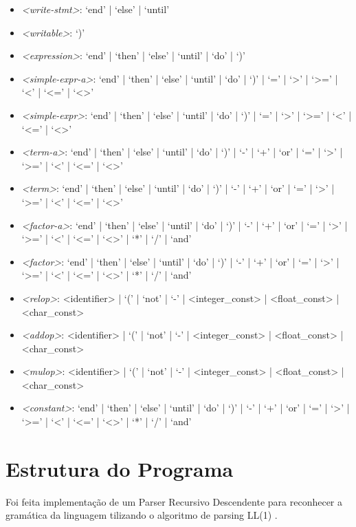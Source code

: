 \begin{itemize}
\begin{itemize}
            \item \textit{<write-stmt>}: `end' | `else' | `until' 
            \item \textit{<writable>}: `)'
            \item \textit{<expression>}: `end' | `then' | `else' | `until' | `do' | `)'
            \item \textit{<simple-expr-a>}: `end' | `then' | `else' | `until' | `do' | `)' | `=' | `>' | `>=' | `<' | `<=' | `<>'
            \item \textit{<simple-expr>}: `end' | `then' | `else' | `until' | `do' | `)' | `=' | `>' | `>=' | `<' | `<=' | `<>'
            \item \textit{<term-a>}: `end' | `then' | `else' | `until' | `do' | `)' | `-' | `+' | `or' | `=' | `>' | `>=' | `<' | `<=' | `<>'
            \item \textit{<term>}: `end' | `then' | `else' | `until' | `do' | `)' | `-' | `+' | `or' | `=' | `>' | `>=' | `<' | `<=' | `<>'
            \item \textit{<factor-a>}: `end' | `then' | `else' | `until' | `do' | `)' | `-' | `+' | `or' | `=' | `>' | `>=' | `<' | `<=' | `<>' | `*' | `/' | `and'
            \item \textit{<factor>}: `end' | `then' | `else' | `until' | `do' | `)' | `-' | `+' | `or' | `=' | `>' | `>=' | `<' | `<=' | `<>' | `*' | `/' | `and'
            \item \textit{<relop>}: <identifier> | `(' | `not' | `-' | <integer_const> | <float_const> | <char_const>
            \item \textit{<addop>}: <identifier> | `(' | `not' | `-' | <integer_const> | <float_const> | <char_const>
            \item \textit{<mulop>}: <identifier> | `(' | `not' | `-' | <integer_const> | <float_const> | <char_const>
            \item \textit{<constant>}: `end' | `then' | `else' | `until' | `do' | `)' | `-' | `+' | `or' | `=' | `>' | `>=' | `<' | `<=' | `<>' | `*' | `/' | `and'
        \end{itemize}
    \end{itemize}
    
\section{Estrutura do Programa}
\label{sec:sintaticoEstrutura}
Foi feita implementação de um Parser Recursivo Descendente para reconhecer a gramática da linguagem tilizando o algoritmo de parsing LL(1) .

